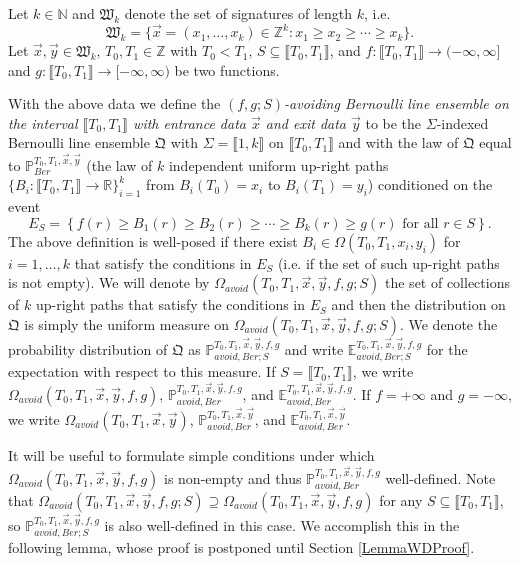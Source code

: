 \begin{definition}\label{DefAvoidingLawBer}
Let $k \in \mathbb{N}$ and $\mathfrak{W}_k$ denote the set of signatures of length $k$, i.e.
$$\mathfrak{W}_k = \{ \vec{x} = (x_1, \dots, x_k) \in \mathbb{Z}^k: x_1 \geq  x_2 \geq  \cdots \geq  x_k \}.$$
Let $\vec{x}, \vec{y} \in \mathfrak{W}_k$, $T_0, T_1 \in \mathbb{Z}$ with $T_0 < T_1$, $S\subseteq\llbracket T_0,T_1\rrbracket$, and $f: \llbracket T_0, T_1 \rrbracket \rightarrow (-\infty, \infty]$ and $g: \llbracket T_0, T_1 \rrbracket \rightarrow [-\infty, \infty)$ be two functions. 

With the above data we define the {\em $(f,g;S)$-avoiding Bernoulli line ensemble on the interval $\llbracket T_0, T_1 \rrbracket$ with entrance data $\vec{x}$ and exit data $\vec{y}$} to be the $\Sigma$-indexed Bernoulli line ensemble $\mathfrak{Q}$ with $\Sigma = \llbracket 1, k\rrbracket$ on $\llbracket T_0, T_1 \rrbracket$ and with the law of $\mathfrak{Q}$ equal to $\mathbb{P}^{T_0,T_1, \vec{x},\vec{y}}_{Ber}$ (the law of $k$ independent uniform up-right paths $\{B_i: \llbracket T_0, T_1 \rrbracket \rightarrow \mathbb{R} \}_{i = 1}^k$ from $B_i(T_0) = x_i$ to $B_i(T_1) = y_i$) conditioned on the event 
$$E_S  = \left\{ f(r) \geq B_1(r) \geq B_2(r) \geq \cdots \geq B_k(r) \geq g(r) \mbox{ for all $r \in S$} \right\}.$$ 
The above definition is well-posed if there exist $B_i \in \Omega(T_0,T_1,x_i,y_i)$ for $i = 1, \dots, k$ that satisfy the conditions in $E_S$ (i.e. if the set of such up-right paths is not empty). We will denote by $\Omega_{avoid}(T_0, T_1, \vec{x}, \vec{y}, f,g; S)$ the set of collections of $k$ up-right paths that satisfy the conditions in $E_S$ and then the distribution on $\mathfrak{Q}$ is simply the uniform measure on $\Omega_{avoid}(T_0, T_1, \vec{x}, \vec{y}, f,g; S)$. We denote the probability distribution of $\mathfrak{Q}$ as $\mathbb{P}_{avoid, Ber;S}^{T_0,T_1, \vec{x}, \vec{y}, f, g}$ and write $\mathbb{E}_{avoid, Ber; S}^{T_0, T_1, \vec{x}, \vec{y}, f, g}$ for the expectation with respect to this measure. If $S = \llbracket T_0,T_1\rrbracket$, we write $\Omega_{avoid}(T_0,T_1,\vec{x},\vec{y},f,g)$, $\mathbb{P}_{avoid, Ber}^{T_0,T_1, \vec{x}, \vec{y}, f, g}$, and $\mathbb{E}_{avoid, Ber}^{T_0, T_1, \vec{x}, \vec{y}, f, g}$. If $f=+\infty$ and $g=-\infty$, we write $\Omega_{avoid}(T_0,T_1,\vec{x},\vec{y})$, $\mathbb{P}^{T_0, T_1, \vec{x},\vec{y}}_{avoid, Ber}$, and $\mathbb{E}^{T_0, T_1, \vec{x},\vec{y}}_{avoid, Ber}$.
\end{definition}


It will be useful to formulate simple conditions under which $\Omega_{avoid}(T_0, T_1, \vec{x}, \vec{y}, f,g)$ is non-empty and thus $\mathbb{P}_{avoid, Ber}^{T_0,T_1, \vec{x}, \vec{y}, f, g}$ well-defined. Note that $\Omega_{avoid}(T_0, T_1, \vec{x}, \vec{y}, f, g; S) \supseteq \Omega_{avoid}(T_0, T_1, \vec{x}, \vec{y}, f,g)$ for any $S\subseteq\llbracket T_0, T_1\rrbracket$, so $\mathbb{P}_{avoid, Ber; S}^{T_0,T_1, \vec{x}, \vec{y}, f, g}$ is also well-defined in this case. We accomplish this in the following lemma, whose proof is postponed until Section \ref{LemmaWDProof}.


